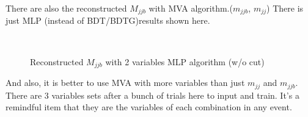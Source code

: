			There are also the reconstructed $M_{jjb}$ with MVA algorithm.($m_{jjb}$, $m_{jj}$) There is just MLP (instead of BDT/BDTG)results shown here.

			\begin{figure}[H]
			\centering
			    \\
			\caption{Reconstructed $M_{jjb}$ with 2 variables MLP algorithm (w/o cut)}
			\label{EventSelReco:fig:a04_MLP_SR_NC_Mjjb}
			\end{figure}
			\FloatBarrier

			And also, it is better to use MVA with more variables than just $m_{jj}$ and $m_{jjb}$. There are 3 variables sets after a bunch of trials here to input and train. It's a remindful item that they are the variables of each combination in any event.

